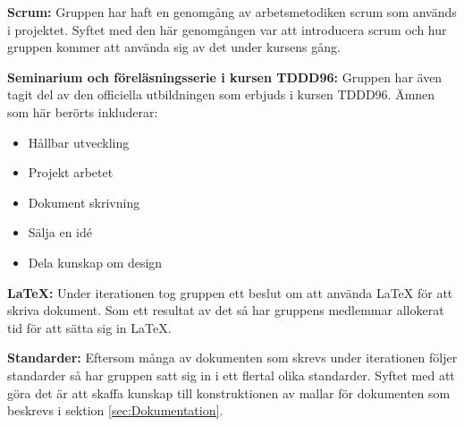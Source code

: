 \documentclass[a4paper,10pt]{article}
\begin{document}
\textbf{Scrum:} Gruppen har haft en genomgång av arbetsmetodiken scrum som används i projektet. Syftet med den här genomgången var att introducera scrum och hur gruppen kommer att använda sig av det under kursens gång.

\textbf{Seminarium och föreläsningsserie i kursen TDDD96:} Gruppen har även tagit del av den officiella utbildningen som erbjuds i kursen TDDD96. Ämnen som här berörts inkluderar:
\begin{itemize}
    \item Hållbar utveckling
    \item Projekt arbetet
    \item Dokument skrivning
    \item Sälja en idé
    \item Dela kunskap om design
\end{itemize}

\textbf{\LaTeX:} Under iterationen tog gruppen ett beslut om att använda LaTeX för att skriva dokument. Som ett resultat av det så har gruppens medlemmar allokerat tid för att sätta sig in LaTeX.

\textbf{Standarder:} Eftersom många av dokumenten som skrevs under iterationen följer standarder så har gruppen satt sig in i ett flertal olika standarder. Syftet med att göra det är att skaffa kunskap till konstruktionen av mallar för dokumenten som beskrevs i sektion \ref{sec:Dokumentation}.
\end{document}
